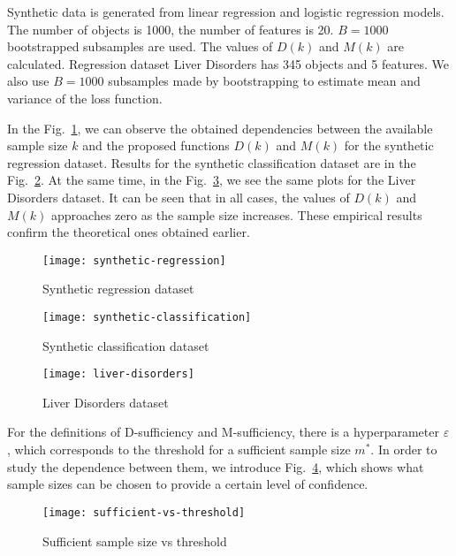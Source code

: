 \documentclass[runningheads]{llncs}
\begin{document}
Synthetic data is generated from linear regression and logistic regression models. The number of objects is 1000, the number of features is 20. $B=1000$ bootstrapped subsamples are used. The values of $D(k)$ and $M(k)$ are calculated.  Regression dataset Liver Disorders has 345 objects and 5 features. We also use $B=1000$ subsamples made by bootstrapping to estimate mean and variance of the loss function. 

In the Fig.~\ref{synthetic-regression}, we can observe the obtained dependencies between the available sample size $k$ and the proposed functions $D(k)$ and $M(k)$ for the synthetic regression dataset. Results for the synthetic classification dataset are in the Fig.~\ref{synthetic-classification}. At the same time, in the Fig.~\ref{liver-disorders}, we see the same plots for the Liver Disorders dataset. It can be seen that in all cases, the values of $D(k)$ and $M(k)$ approaches zero as the sample size increases. These empirical results confirm the theoretical ones obtained earlier.

\begin{figure}[ht]
    \centering
    \texttt{[image: synthetic-regression]}
    \caption{Synthetic regression dataset}
    \label{synthetic-regression}
\end{figure}

\begin{figure}[ht]
    \centering
    \texttt{[image: synthetic-classification]}
    \caption{Synthetic classification dataset}
    \label{synthetic-classification}
\end{figure}

\begin{figure}[ht]
    \centering
    \texttt{[image: liver-disorders]}
    \caption{Liver Disorders dataset}
    \label{liver-disorders}
\end{figure}

For the definitions of D-sufficiency and M-sufficiency, there is a hyperparameter $\varepsilon$, which corresponds to the threshold for a sufficient sample size $m^*$. In order to study the dependence between them, we introduce Fig.~\ref{sufficient-vs-threshold}, which shows what sample sizes can be chosen to provide a certain level of confidence.

\begin{figure}[ht]
    \centering
    \texttt{[image: sufficient-vs-threshold]}
    \caption{Sufficient sample size vs threshold}
    \label{sufficient-vs-threshold}
\end{figure}
\end{document}
